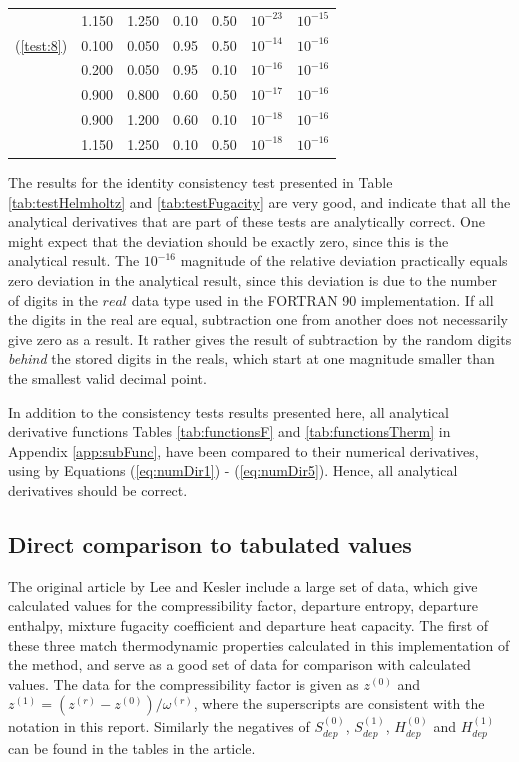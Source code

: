 \documentclass[english]{../thermomemo/thermomemo}
\numberwithin{equation}{section}
\newcommand*{\reff}[1]{(\ref{#1})}
\begin{document}
\begin{table}[h!]
\begin{tabular}{c c c c c c c}
      				& 1.150	& 1.250	& 0.10		&0.50		& $10^{-23}$	&  $10^{-15}$	\\
      \reff{test:8}	& 0.100	& 0.050	& 0.95		&0.50		& $10^{-14}$	&  $10^{-16}$	\\
      				& 0.200	& 0.050	& 0.95		&0.10		& $10^{-16}$	&  $10^{-16}$	\\
      				& 0.900	& 0.800	& 0.60		&0.50		& $10^{-17}$	&  $10^{-16}$	\\
      				& 0.900	& 1.200	& 0.60		&0.10		& $10^{-18}$	&  $10^{-16}$	\\
      				& 1.150	& 1.250	& 0.10		&0.50		& $10^{-18}$	&  $10^{-16}$	\\
      \hline
    \end{tabular}
\end{table}

The results for the identity consistency test presented in Table \ref{tab:testHelmholtz} and \ref{tab:testFugacity} are very good, and indicate that all the analytical derivatives that are part of these tests are analytically correct. One might expect that the deviation should be exactly zero, since this is the analytical result. The $10^{-16}$ magnitude of the relative deviation practically equals zero deviation in the analytical result, since this deviation is due to the number of digits in the $real$ data type used in the FORTRAN 90 implementation. If all the digits in the real are equal, subtraction one from another does not necessarily give zero as a result. It rather gives the result of subtraction by the random digits \textit{behind} the stored digits in the reals, which start at one magnitude smaller than the smallest valid decimal point.

In addition to the consistency tests results presented here, all analytical derivative functions Tables \ref{tab:functionsF} and \ref{tab:functionsTherm} in Appendix \ref{app:subFunc}, have been compared to their numerical derivatives, using by Equations \reff{eq:numDir1} - \reff{eq:numDir5}. Hence, all analytical derivatives should be correct.

\subsection{Direct comparison to tabulated values}
\label{subsec:dircomp}
The original article by Lee and Kesler \cite{LK} include a large set of data, which give calculated values for the compressibility factor, departure entropy, departure enthalpy, mixture fugacity coefficient and departure heat capacity. The first of these three match thermodynamic properties calculated in this implementation of the method, and serve as a good set of data for comparison with calculated values. The data for the compressibility factor is given as $z^{(0)}$ and $z^{(1)} = (z^{(r)} - z^{(0)})/\omega^{(r)}$, where the superscripts are consistent with the notation in this report. Similarly the negatives of $S_{dep}^{(0)}$, $S_{dep}^{(1)}$, $H_{dep}^{(0)}$ and $H_{dep}^{(1)}$ can be found in the tables in the article. 
\end{document}
